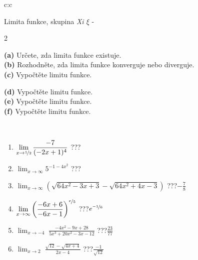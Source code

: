 \documentclass[10pt]{report}
\begin{document}
\begin{tabular}{c:c}
\begin{minipage}[c][104.5mm][t]{0.5\linewidth}
\begin{center}
\vspace{7mm}
{\huge Limita funkce, skupina \textit{Xi $\xi$} -}\\[5mm]
\begin{minipage}{0.95\linewidth}
\begin{center}
{\small \begin{multicols}{2} \raggedright
\textbf{(a)} Určete, zda limita funkce existuje. \\[1mm]
\textbf{(b)} Rozhodněte, zda limita funkce konverguje nebo diverguje. \\[1mm]
\textbf{(c)} Vypočtěte limitu funkce. \par \columnbreak
\textbf{(d)} Vypočtěte limitu funkce. \\[1mm]
\textbf{(e)} Vypočtěte limitu funkce. \\[1mm]
\textbf{(f)} Vypočtěte limitu funkce. \\[1mm]
\end{multicols}
}
\end{center}
\end{minipage}
\\[4mm]
\begin{minipage}{0.79\linewidth}
\begin{center}
\begin{varwidth}{\linewidth}
\begin{enumerate}
\normalsize
\item $\displaystyle\lim_{x\to\nicefrac{1}{2}}{\frac{-7}{(-2x+1)^{4}}}$\quad \dotfill\; ???\;\dotfill \quad {}
\item $\displaystyle\lim_{x\to\infty}{5^{-1-4x^2}}$\quad \dotfill\; ???\;\dotfill \quad {}
\item $\displaystyle\lim_{x\to\infty}{\left(\sqrt{64x^2-3x+3} - \sqrt{64x^2+4x-3}\right)}$\quad \dotfill\; ???\;\dotfill \quad $-\frac{7}{8}$
\item $\displaystyle\lim_{x\to\infty}{\left( \frac{-6x+6}{-6x-1} \right)^{\nicefrac{x}{5}}}$\quad \dotfill\; ???\;\dotfill \quad $e^{\nicefrac{-1}{6}}$
\item $\displaystyle\lim_{x\to -4}{\;\frac{-4x^2-9x+28}{5x^3+20x^2-3x-12}}$\quad \dotfill\; ???\;\dotfill \quad $\frac{23}{77}$
\item $\displaystyle\lim_{x\to 2}{\;\frac{\sqrt{12}-\sqrt{4x+4}}{2x-4}}$\quad \dotfill\; ???\;\dotfill \quad $\frac{-1}{\sqrt{12}}$

\end{enumerate}
\end{varwidth}
\end{center}
\end{minipage}
\end{center}
\end{minipage}
\end{tabular}
\end{document}
